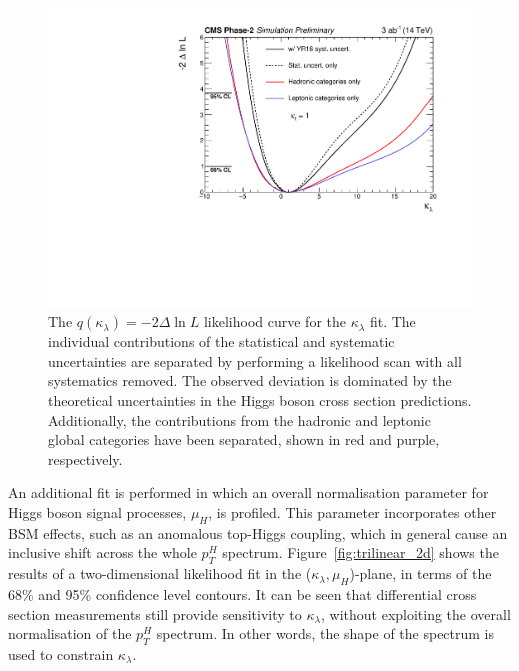 \begin{figure}[htb!]
  \centering
  \includegraphics[width=.7\textwidth]{Figures/cms/trilinear/CMS-PAS-FTR-18-020_Figure_007.pdf}
  \caption[Likelihood curve for the $\kappa_\lambda$ fit]
  {
    The $q(\kappa_\lambda)=-2\Delta \ln L$ likelihood curve for the $\kappa_\lambda$ fit. The individual contributions of the statistical and systematic uncertainties are separated by performing a likelihood scan with all systematics removed. The observed deviation is dominated by the theoretical uncertainties in the Higgs boson cross section predictions. Additionally, the contributions from the hadronic and leptonic global categories have been separated, shown in red and purple, respectively.
  }
  \label{fig:trilinear_likelihood}
\end{figure}

An additional fit is performed in which an overall normalisation parameter for Higgs boson signal processes, $\mu_H$, is profiled. This parameter incorporates other BSM effects, such as an anomalous top-Higgs coupling, which in general cause an inclusive shift across the whole $p_T^H$ spectrum. Figure~\ref{fig:trilinear_2d} shows the results of a two-dimensional likelihood fit in the ($\kappa_\lambda,\mu_H$)-plane, in terms of the 68\% and 95\% confidence level contours. It can be seen that differential cross section measurements still provide sensitivity to $\kappa_\lambda$, without exploiting the overall normalisation of the $p_T^H$ spectrum. In other words, the shape of the spectrum is used to constrain $\kappa_\lambda$.

